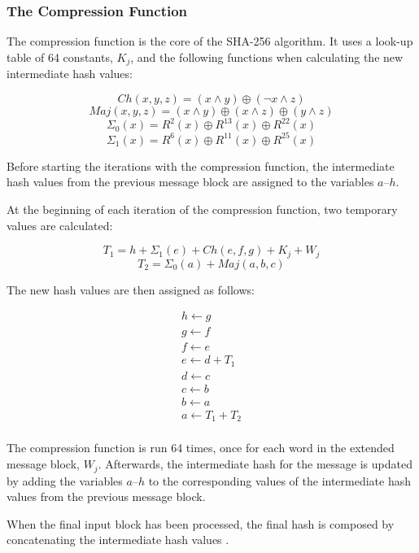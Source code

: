 \subsubsection{The Compression Function}
\label{sec:sha-compr}
The compression function is the core of the SHA-256 algorithm. It uses a look-up table
of 64 constants, $K_j$, and the following functions when calculating the new intermediate
hash values:

\[Ch(x,y,z) = (x \wedge y) \oplus (\neg x \wedge z)\]
\[Maj(x, y, z) = (x \wedge y) \oplus (x \wedge z) \oplus (y \wedge z)\]
\[\Sigma_0(x) = R^2(x) \oplus R^{13}(x) \oplus R^{22}(x)\]
\[\Sigma_1(x) = R^6(x) \oplus R^{11}(x) \oplus R^{25}(x)\]

Before starting the iterations with the compression function, the intermediate
hash values from the previous message block are assigned to the variables $a$--$h$.

At the beginning of each iteration of the compression function, two temporary
values are calculated:

\[T_1 = h + \Sigma_1(e) + Ch(e, f, g) + K_j + W_j\]
\[T_2 = \Sigma_0(a) + Maj(a, b, c)\]

The new hash values are then assigned as follows:

\[\begin{array}{l}
	h \leftarrow g \\
	g \leftarrow f \\
	f \leftarrow e \\
	e \leftarrow d + T_1\\
	d \leftarrow c \\
	c \leftarrow b \\
	b \leftarrow a \\
	a \leftarrow T_1 + T_2 \\
\end{array}\]

The compression function is run 64 times, once for each word in the extended message block,
$W_j$. Afterwards, the intermediate hash for the message is updated by adding the
variables $a$--$h$ to the corresponding values of the intermediate hash values from
the previous message block.

When the final input block has been processed, the final hash is composed by
concatenating the intermediate hash values \cite{sha-spec}.
